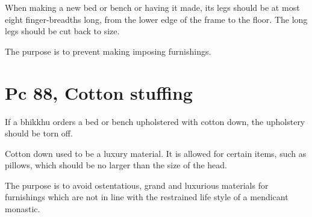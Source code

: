 When making a new bed or bench or having it made, its legs should be at
most eight finger-breadths long, from the lower edge of the frame to the
floor. The long legs should be cut back to size.

The purpose is to prevent making imposing furnishings.

\section{Pc 88, Cotton stuffing}

If a bhikkhu orders a bed or bench upholstered with cotton down, the
upholstery should be torn off.

Cotton down used to be a luxury material. It is allowed for certain
items, such as pillows, which should be no larger than the size of the
head.

The purpose is to avoid ostentatious, grand and luxurious materials for
furnishings which are not in line with the restrained life style of a
mendicant monastic.

